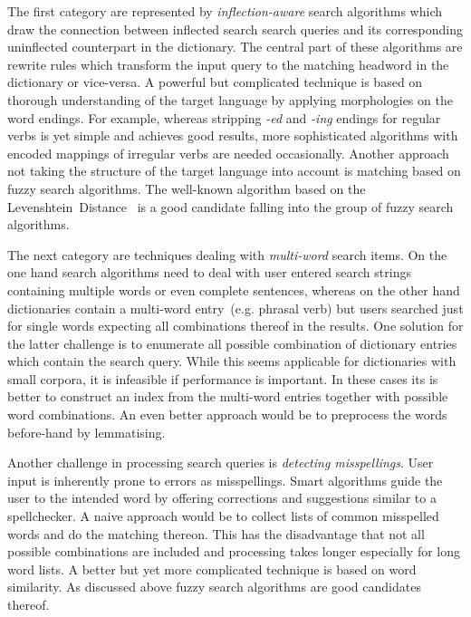 \documentclass[draft,final]{vutinfth} %
\begin{document}
The first category are represented by \textit{inflection-aware} search algorithms which draw the connection between inflected search search queries and its corresponding uninflected counterpart in the dictionary. The central part of these algorithms are rewrite rules which transform the input query to the matching headword in the dictionary or vice-versa. A powerful but complicated technique is based on thorough understanding of the target language by applying morphologies on the word endings. For example, whereas stripping \emph{-ed} and \emph{-ing} endings for regular verbs is yet simple and achieves good results, more sophisticated algorithms with encoded mappings of irregular verbs are needed occasionally. Another approach not taking the structure of the target language into account is matching based on fuzzy search algorithms. The well-known algorithm based on the Levenshtein~Distance~\cite{levenshtein1966} is a good candidate falling into the group of fuzzy search algorithms. 

The next category are techniques dealing with \textit{multi-word} search items. On the one hand search algorithms need to deal with user entered search strings containing multiple words or even complete sentences, whereas on the other hand dictionaries contain a multi-word entry~(e.g. phrasal verb) but users searched just for single words expecting all combinations thereof in the results. One solution for the latter challenge is to enumerate all possible combination of dictionary entries which contain the search query. While this seems applicable for dictionaries with small corpora, it is infeasible if performance is important. In these cases its is better to construct an index from the multi-word entries together with possible word combinations. An even better approach would be to preprocess the words before-hand by lemmatising.

Another challenge in processing search queries is \textit{detecting misspellings}. User input is inherently prone to errors as misspellings. Smart algorithms guide the user to the intended word by offering corrections and suggestions similar to a spellchecker. A naive approach would be to collect lists of common misspelled words and do the matching thereon. This has the disadvantage that not all possible combinations are included and processing takes longer especially for long word lists. A better but yet more complicated technique is based on word similarity. As discussed above fuzzy search algorithms are good candidates thereof. 
\end{document}
